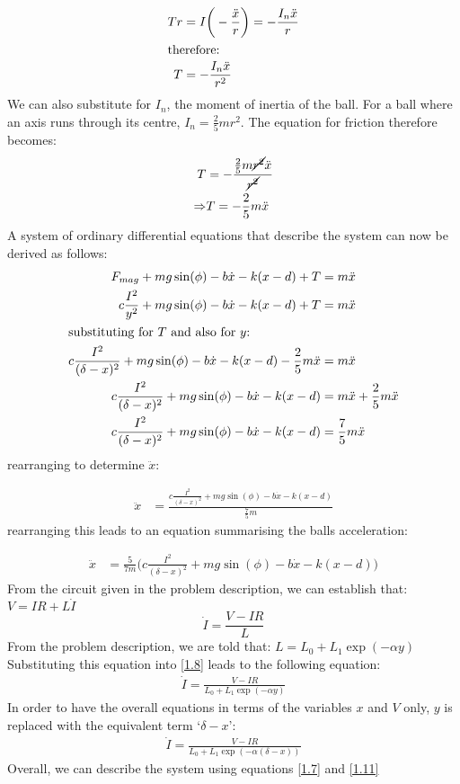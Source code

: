 \documentclass[a4paper,10pt,reqno]{amsart}
\numberwithin{equation}{section}
\begin{document}
\begin{align}
Tr &= I\bigg(- \frac{\ddot{x}}{r}\bigg) = -\frac{I_n\ddot{x}}{r} \nonumber \\ 
\intertext{therefore:}
T &= - \frac{I_n\ddot{x}}{r^2} \label{1.4}
\end{align}
We can also substitute for $I_n$, the moment of inertia of the ball. 
For a ball where an axis runs through its centre, $I_n = \frac{2}{5}mr^2$. The equation for friction therefore becomes:
\begin{align}
T &= -\frac{\frac{2}{5}m\cancel{r^2}\ddot{x}}{\cancel{r^2}} \nonumber \\
\Rightarrow& T = - \frac{2}{5}m\ddot{x} \label{1.5}
\end{align}
\vspace{3mm}
A system of ordinary differential equations that describe the system can now be derived as follows:
\begin{align}
F_{mag} + mg\sin(\phi) - b\dot{x} - k(x - d) + T &= m\ddot{x} \nonumber \\
c \frac{I^2}{y^2} + mg\sin(\phi) - b\dot{x} - k(x - d) + T &= m\ddot{x} \nonumber \\
\intertext{substituting for $T$ and also for $y$:}
c \frac{I^2}{(\delta - x)^2} + mg\sin(\phi) - b\dot{x} - k(x - d) - \frac{2}{5}m\ddot{x} &= m\ddot{x} \nonumber \\
c \frac{I^2}{(\delta - x)^2} + mg\sin(\phi) - b\dot{x} - k(x - d) &= m\ddot{x} + \frac{2}{5}m\ddot{x}\nonumber \\
c \frac{I^2}{(\delta - x)^2} + mg\sin(\phi) - b\dot{x} - k(x - d) &= \frac{7}{5}m\ddot{x}\nonumber
\end{align}
rearranging to determine $\ddot{x}$:

\begin{align}
\ddot{x} &= \frac{c \frac{I^2}{(\delta - x)^2} + mg\sin(\phi) - b\dot{x} - k(x-d)}{\frac{7}{5}m} \label{1.6}
\end{align}
rearranging this leads to an equation summarising the balls acceleration:

\begin{align}
\ddot{x} &= \frac{5}{7m}\bigg(c \frac{I^2}{(\delta - x)^2} + mg\sin(\phi) - b\dot{x} - k(x-d)\bigg) \label{1.7}
\end{align}
From the circuit given in the problem description, we can establish that:
$V = IR + L\dot{I}$
\begin{equation}
  \dot{I} = \frac{V - IR}{L} \label{1.8}   
\end{equation}
From the problem description, we are told that: $L = L_0 + L_1\exp(-\alpha y)$
Substituting this equation into \eqref{1.8} leads to the following equation:
\begin{align}
\dot{I} = \frac{V - IR}{L_0 + L_1\exp(-\alpha y)} \label{1.10}
\end{align}
In order to have the overall equations in terms of the variables $x$ and $V$ only, $y$ is replaced with the equivalent term `$\delta - x$':
\begin{align}
\dot{I} = \frac{V - IR}{L_0 + L_1\exp(-\alpha (\delta - x))} \label{1.11}
\end{align}
Overall, we can describe the system using equations \eqref{1.7} and \eqref{1.11}
\end{document}
